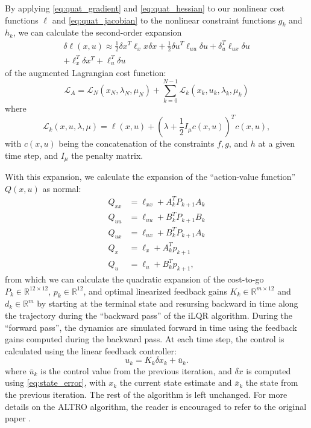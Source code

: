 \documentclass[letterpaper, 10 pt, conference]{ieeeconf}  %
\newcommand{\half}{\frac{1}{2}}
\newcommand{\R}{\mathbb{R}}
\begin{document}
    By applying \eqref{eq:quat_gradient} and \eqref{eq:quat_hessian} to our nonlinear cost
    functions $\ell$ and 
    \eqref{eq:quat_jacobian} to the nonlinear constraint functions $g_k$ and $h_k$, we can calculate
    the second-order expansion 
    \begin{multline}
        \delta \ell(x,u) \approx  \half \delta x^T \ell_xx \delta x
            + \half \delta u^T \ell_{uu} \delta u + \delta_u^T \ell_{ux} \delta u \\
            + \ell_x^T \delta x^T + \ell_u^T \delta u 
    \end{multline}
    of the augmented Lagrangian cost function:
    \begin{equation}
        \mathcal{L}_A = \mathcal{L}_N(x_N,\lambda_N,\mu_N) + 
            \sum_{k=0}^{N-1} \mathcal{L}_k(x_k,u_k,\lambda_k,\mu_k)
    \end{equation}
    where
    \begin{equation}
        \mathcal{L}_k(x,u,\lambda,\mu) = \ell(x,u) + 
            (\lambda + \half I_\mu c(x,u))^T c(x,u),
    \end{equation}
    with $c(x,u)$ being the concatenation of the constraints $f,g$, and $h$ at a given time step,
    and $I_\mu$ the penalty matrix.

    With this expansion, we calculate the expansion of the ``action-value function'' $Q(x,u)$
    as normal:
    \begin{align}
        Q_{xx} &= \ell_{xx} + A_{k}^T P_{k+1} A_{k} \label{Qxx_exp}\\
        Q_{uu} &= \ell_{uu} + B_{k}^T P_{k+1} B_{k} \label{Quu_exp}\\
        Q_{ux} &= \ell_{ux} + B_{k}^T P_{k+1} A_{k} \label{Qux_exp}\\
        Q_x &= \ell_x  + A_{k}^T p_{k+1} \label{Qx_exp}\\
        Q_u &= \ell_u + B_{k}^T p_{k+1} \label{Qu_exp},
    \end{align}
    from which we can calculate the quadratic expansion of the cost-to-go 
    $P_k \in \R^{12 \times 12}$, $p_k \in \R^12$, and optimal linearized feedback gains 
    $K_k \in \R^{m \times 12}$ and $d_k \in \R^m$ by starting at the terminal state and
    resursing backward in time along the trajectory during the ``backward pass'' of the iLQR
    algorithm. During the ``forward pass'', the dynamics are simulated forward in time using
    the feedback gains computed during the backward pass. At each time step, the control is 
    calculated using the linear feedback controller: 
    \begin{equation} \label{eq:mlqr_control}
        u_k = K_k \delta x_k + \bar{u}_k.
    \end{equation}
    where $\bar{u}_k$ is the control value from the previous iteration, and $\delta x$ is 
    computed using \eqref{eq:state_error}, with $x_k$ the current state estimate and $\bar{x}_k$
    the state from the previous iteration. The rest of the algorithm is left unchanged. 
    For more details on the ALTRO algorithm, the reader is encouraged to refer to the original
    paper \cite{howell2019altro}.
\end{document}
